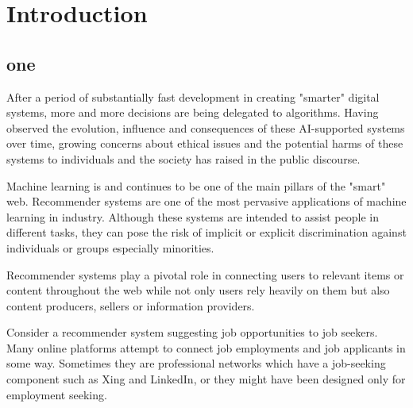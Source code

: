 \chapter{Introduction}
\label{introchap}



\section{one}

\begin{comment}
example 
problems that exist
approaches
\end{comment}


After a period of substantially fast development in creating "smarter" digital systems, more and more decisions are being delegated to algorithms. Having observed the evolution, influence and consequences of these AI-supported systems over time, growing concerns about ethical issues and the potential harms of these systems to individuals and the society has raised in the public discourse.

Machine learning is and continues to be one of the main pillars of the "smart" web. Recommender systems are one of the most pervasive applications of machine learning in industry. Although these systems are intended to assist people in different tasks, they can pose the risk of implicit or explicit discrimination against individuals or groups especially minorities.


Recommender systems play a pivotal role in connecting users to relevant items or content throughout the web while not only users rely heavily on them but also content producers, sellers or information providers. 

Consider a recommender system suggesting job opportunities to job seekers. Many online platforms attempt to connect job employments and job applicants in some way. Sometimes they are professional networks which have a job-seeking component such as Xing and LinkedIn, or they might have been designed only for employment seeking.

